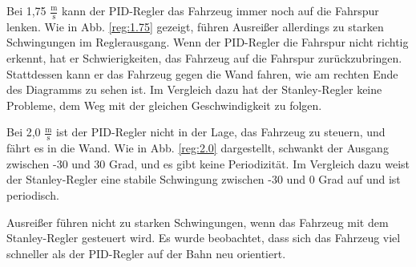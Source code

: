 \documentclass[arbeit=studie,oneside,BCOR=12mm]{ArbeitRST}
\begin{document}
Bei 1,75 $\frac{\mathrm{m}}{\mathrm{s}}$ kann der PID-Regler das Fahrzeug immer noch auf die Fahrspur
lenken. Wie in Abb. \ref{reg:1.75} gezeigt, führen Ausreißer allerdings zu starken
Schwingungen im Reglerausgang. Wenn der PID-Regler die Fahrspur nicht richtig
erkennt, hat er Schwierigkeiten, das Fahrzeug auf die Fahrspur zurückzubringen.
Stattdessen kann er das Fahrzeug gegen die Wand fahren, wie am rechten Ende des
Diagramms zu sehen ist. Im Vergleich dazu hat der Stanley-Regler keine
Probleme, dem Weg mit der gleichen Geschwindigkeit zu folgen.

Bei 2,0 $\frac{\mathrm{m}}{\mathrm{s}}$ ist der PID-Regler nicht in der Lage, das Fahrzeug zu steuern, und
fährt es in die Wand. Wie in Abb. \ref{reg:2.0} dargestellt, schwankt der Ausgang
zwischen -30 und 30 Grad, und es gibt keine Periodizität. Im Vergleich dazu
weist der Stanley-Regler eine stabile Schwingung zwischen -30 und 0 Grad auf
und ist periodisch.

Ausreißer führen nicht zu starken Schwingungen, wenn das Fahrzeug mit dem
Stanley-Regler gesteuert wird. Es wurde beobachtet, dass sich das Fahrzeug viel
schneller als der PID-Regler auf der Bahn neu orientiert.
\end{document}
